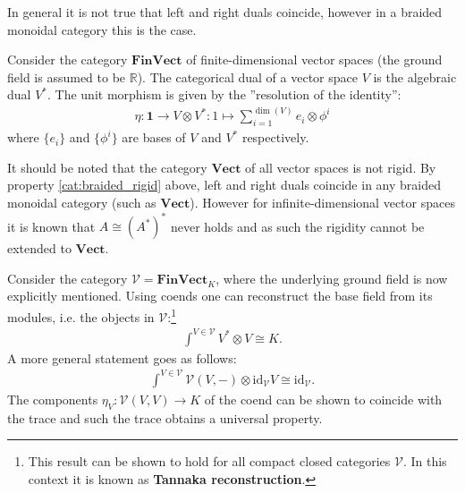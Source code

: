 
    \begin{property}\label{cat:braided_rigid}
        In general it is not true that left and right duals coincide, however in a braided monoidal category this is the case.
    \end{property}

    \begin{example}[FinVect]
        Consider the category $\mathbf{FinVect}$ of finite-dimensional vector spaces (the ground field is assumed to be $\mathbb{R}$). The categorical dual of a vector space $V$ is the algebraic dual $V^*$. The unit morphism is given by the ''resolution of the identity'':
        \begin{gather}
            \eta: \mathbf{1}\rightarrow V\otimes V^*:1\mapsto\sum_{i=1}^{\dim(V)}e_i\otimes \phi^i
        \end{gather}
        where $\{e_i\}$ and $\{\phi^i\}$ are bases of $V$ and $V^*$ respectively.

        It should be noted that the category $\mathbf{Vect}$ of all vector spaces is not rigid. By property \ref{cat:braided_rigid} above, left and right duals coincide in any braided monoidal category (such as $\mathbf{Vect}$). However for infinite-dimensional vector spaces it is known that $A\cong(A^*)^*$ never holds and as such the rigidity cannot be extended to $\mathbf{Vect}$.
    \end{example}
    \begin{property}
        Consider the category $\mathcal{V}=\mathbf{FinVect}_K$, where the underlying ground field is now explicitly mentioned. Using coends one can reconstruct the base field from its modules, i.e. the objects in $\mathcal{V}$:\footnote{This result can be shown to hold for all compact closed categories $\mathcal{V}$. In this context it is known as \textbf{Tannaka reconstruction}.}
        \begin{gather}
            \int^{V\in\mathcal{V}}V^*\otimes V\cong K.
        \end{gather}
        A more general statement goes as follows:
        \begin{gather}
            \int^{V\in\mathcal{V}}\mathcal{V}(V, -)\otimes\text{id}_{\mathcal{V}}V\cong\text{id}_{\mathcal{V}}.
        \end{gather}
        The components $\eta_V:\mathcal{V}(V, V)\rightarrow K$ of the coend can be shown to coincide with the trace and such the trace obtains a universal property.
    \end{property}
